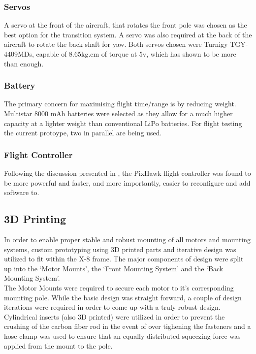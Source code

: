 \subsubsection*{Servos}
A servo at the front of the aircraft, that rotates the front pole was chosen as the best option for the transition system. A servo was also required at the back of the aircraft to rotate the back shaft for yaw. Both servos chosen were Turnigy TGY-4409MDs, capable of 8.65kg.cm of torque at 5v, which has shown to be more than enough. 
		
\subsubsection*{Battery}
The primary concern for maximising flight time/range is by reducing weight. Multistar 8000 mAh batteries were selected as they allow for a much higher capacity at a lighter weight than conventional LiPo batteries. For flight testing the current protoype, two in parallel are being used. 
	
\subsubsection*{Flight Controller}
Following the discussion presented in \cite{ref:controller_comparison}, the PixHawk flight controller was found to be more powerful and faster, and more importantly, easier to reconfigure and add software to.

\subsection{3D Printing}
In order to enable proper stable and robust mounting of all motors and mounting systems, custom prototyping using 3D printed parts and iterative design was utilized to fit within the X-8 frame. The major components of design were split up into the `Motor Mounts', the `Front  Mounting System' and the `Back Mounting System'.\\

The Motor Mounts were required to secure each motor to it's corresponding mounting pole. While the basic design was straight forward, a couple of design iterations were required in order to come up with a truly robust design. Cylindrical inserts (also 3D printed) were utilized in order to prevent the crushing of the carbon fiber rod in the event of over tighening the fasteners and a hose clamp was used to ensure that an equally distributed squeezing force was applied from the mount to the pole.\\

